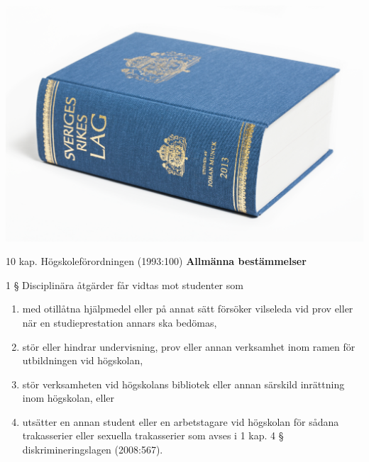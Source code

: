 \begin{frame}
  \includegraphics[width=\columnwidth]{fig/SverigesRikesLag.png}
\end{frame}

\begin{frame}
  \begin{block}{10 kap. Högskoleförordningen (1993:100)\nocite{SFS1993:100}}
    \textbf{Allmänna bestämmelser}

    \vspace{0.5em}
    1 §   Disciplinära åtgärder får vidtas mot studenter som
    \begin{enumerate}
      \item med otillåtna hjälpmedel eller på annat sätt försöker vilseleda vid 
        prov eller när en studieprestation annars ska bedömas,
      \item stör eller hindrar undervisning, prov eller annan verksamhet inom 
        ramen för utbildningen vid högskolan,
      \item stör verksamheten vid högskolans bibliotek eller annan särskild 
        inrättning inom högskolan, eller
      \item utsätter en annan student eller en arbetstagare vid högskolan för 
        sådana trakasserier eller sexuella trakasserier som avses i 1 kap. 4 § 
        diskrimineringslagen (2008:567).
    \end{enumerate}
  \end{block}
\end{frame}

